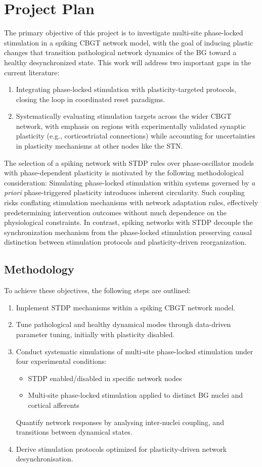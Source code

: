 \section{Project Plan}
The primary objective of this project is to investigate multi-site phase-locked stimulation in a spiking CBGT network
model, with the goal of inducing plastic changes that transition pathological network dynamics of the BG toward
a healthy desynchronized state. This work will address two important gaps in the current literature:
\begin{enumerate}[nosep]
	\item Integrating phase-locked stimulation with plasticity-targeted protocols, closing the loop in coordinated
	      reset paradigms.
	\item Systematically evaluating stimulation targets across the wider CBGT network, with emphasis on regions with
	      experimentally validated synaptic plasticity (e.g., corticostriatal connections) while accounting for
	      uncertainties in plasticity mechanisms at other nodes like the STN.
\end{enumerate}
The selection of a spiking network with STDP rules over phase-oscillator models with phase-dependent plasticity is
motivated by the following methodological consideration:
Simulating phase-locked stimulation within systems governed by \textit{a priori} phase-triggered plasticity introduces
inherent circularity.
Such coupling risks conflating stimulation mechanisms with network adaptation rules, effectively predetermining
intervention outcomes without much dependence on the physiological constraints.
In contrast, spiking networks with STDP decouple the synchronization mechanism from the phase-locked stimulation
preserving causal distinction between stimulation protocols and plasticity-driven reorganization.

\subsection{Methodology}
To achieve these objectives, the following steps are outlined:
\begin{enumerate}[nosep]
	\item Implement STDP mechanisms within a spiking CBGT network model.
	\item Tune pathological and healthy dynamical modes through data-driven parameter tuning, initially with plasticity disabled.
	\item Conduct systematic simulations of multi-site phase-locked stimulation under four experimental conditions:
	      \begin{itemize}[nosep]
		      \item STDP enabled/disabled in specific network nodes
		      \item Multi-site phase-locked stimulation applied to distinct BG nuclei and cortical afferents
	      \end{itemize}
	      Quantify network responses by analysing inter-nuclei coupling, and transitions between dynamical states.
	\item Derive stimulation protocols optimized for plasticity-driven network desynchronisation.
\end{enumerate}

